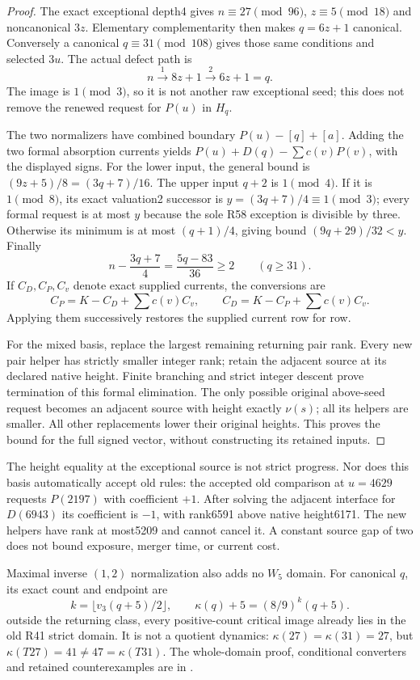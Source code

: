\documentclass[11pt]{article}
\begin{document}
\begin{proof}
The exact exceptional depth4 gives $n\equiv27\pmod{96}$,
$z\equiv5\pmod{18}$ and noncanonical $3z$. Elementary complementarity
then makes $q=6z+1$ canonical. Conversely a canonical $q\equiv31\pmod{108}$
gives those same conditions and selected $3u$. The actual defect path is
\[
 n\xrightarrow{1}8z+1\xrightarrow{2}6z+1=q.
\]
The image is $1\pmod3$, so it is not another raw exceptional seed;
this does not remove the renewed request for $P(u)$ in $H_q$.

The two normalizers have combined boundary $P(u)-[q]+[a]$.
Adding the two formal absorption currents yields
$P(u)+D(q)-\sum c(v)P(v)$, with the displayed signs.
For the lower input, the general bound is
$(9z+5)/8=(3q+7)/16$. The upper input $q+2$ is $1\pmod4$.
If it is $1\pmod8$, its exact valuation2 successor is
$y=(3q+7)/4\equiv1\pmod3$; every formal request is at most $y$
because the sole R58 exception is divisible by three. Otherwise its
minimum is at most $(q+1)/4$, giving bound $(9q+29)/32<y$.
Finally
\[
 n-\frac{3q+7}{4}=\frac{5q-83}{36}\ge2
 \qquad(q\ge31).
\]
If $C_D,C_P,C_v$ denote exact supplied currents, the conversions are
\[
 C_P=K-C_D+\sum c(v)C_v,\qquad
 C_D=K-C_P+\sum c(v)C_v.
\]
Applying them successively restores the supplied current row for row.

For the mixed basis, replace the largest remaining returning pair rank.
Every new pair helper has strictly smaller integer rank; retain the
adjacent source at its declared native height. Finite branching and
strict integer descent prove termination of this formal elimination.
The only possible original above-seed request becomes an adjacent
source with height exactly $\nu(s)$; all its helpers are smaller.
All other replacements lower their original heights. This proves the
bound for the full signed vector, without constructing its retained inputs.
\end{proof}

The height equality at the exceptional source is not strict progress.
Nor does this basis automatically accept old rules: the accepted old
comparison at $u=4629$ requests $P(2197)$ with coefficient $+1$.
After solving the adjacent interface for $D(6943)$ its coefficient is
$-1$, with rank6591 above native height6171. The new helpers have rank
at most5209 and cannot cancel it. A constant source gap of two does not
bound exposure, merger time, or current cost.

Maximal inverse $(1,2)$ normalization also adds no $W_5$ domain.
For canonical $q$, its exact count and endpoint are
\[
 k=\lfloor v_3(q+5)/2\rfloor,\qquad
 \kappa(q)+5=(8/9)^k(q+5).
\]
outside the returning class, every positive-count critical image already
lies in the old R41 strict domain. It is not a quotient dynamics:
$\kappa(27)=\kappa(31)=27$, but
$\kappa(T27)=41\ne47=\kappa(T31)$.
The whole-domain proof, conditional converters and retained counterexamples
are in
.
\end{document}
